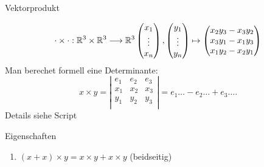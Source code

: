 \documentclass[class=article, crop=false]{standalone}
\begin{document}
\begin{zettel}{Vektorprodukt}
\begin{flashcard}
    \[
        \cdot \times \cdot  : \mathbb{R}^3 \times \mathbb{R}^3 \longrightarrow \mathbb{R}^3\\ \begin{pmatrix}x_1\\ \vdots \\x_n\end{pmatrix}, \begin{pmatrix}y_1\\ \vdots \\ y_n\end{pmatrix} \mapsto \begin{pmatrix}
        x_2 y_3 - x_3 y_2  \\
        x_3 y_1 - x_1 y_3  \\
        x_1 y_2 - x_2 y_1  \\
        \end{pmatrix}
    \]
    Man berechet formell eine Determinante:
    \[
        x \times y = \left|\begin{matrix}
        e_1  & e_2  & e_3  \\
        x_1  & x_2  & x_3  \\
        y_1  & y_2  & y_3  \\
        \end{matrix}\right| = e_1 \dots - e_2 \dots + e_3 \dots
    .\]
    Details siehe Script
\end{flashcard}

\begin{remark}
    Eigenschaften
    \begin{enumerate}
        \item $(x + x )\times y =  x \times  y +  x \times y$ (beidseitig)\\


\end{enumerate}
\end{remark}
\end{zettel}
\end{document}
